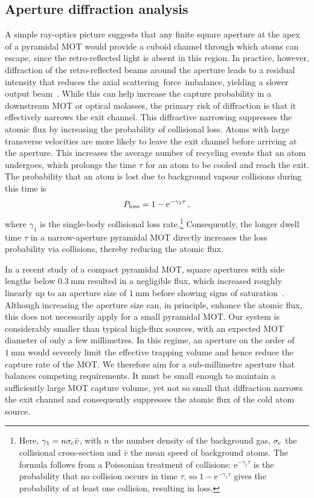 \documentclass[../Thesis-IJspeert.tex]{subfiles}
\begin{document}
\subsection{Aperture diffraction analysis}
\label{pyramidMOTaperture}
A simple ray-optics picture suggests that any finite square aperture at the apex of a pyramidal MOT would provide a cuboid channel through which atoms can escape, since the retro-reflected light is absent in this region. In practice, however, diffraction of the retro-reflected beams around the aperture leads to a residual intensity that reduces the axial scattering force imbalance, yielding a slower output beam~\cite{ravenhall2018a}. While this can help increase the capture probability in a downstream MOT or optical molasses, the primary risk of diffraction is that it effectively narrows the exit channel. This diffractive narrowing suppresses the atomic flux by increasing the probability of collisional loss. Atoms with large transverse velocities are more likely to leave the exit channel before arriving at the aperture. This increases the average number of recycling events that an atom undergoes, which prolongs the time $\tau$ for an atom to be cooled and reach the exit. The probability that an atom is lost due to background vapour collisions during this time is
\begin{equation}
P_{\rm loss} = 1 - \mathrm{e}^{-\gamma_1 \tau}\,,
\end{equation}
where $\gamma_1$ is the single-body collisional loss rate.\footnote{Here, $\gamma_1 = n \sigma_{\rm c} \bar{v}$, with $n$ the number density of the background gas, $\sigma_{\rm c}$ the collisional cross-section and $\bar{v}$ the mean speed of background atoms. The formula follows from a Poissonian treatment of collisions: $\mathrm{e}^{-\gamma_1 \tau}$ is the probability that no collision occurs in time $\tau$, so $1 - \mathrm{e}^{-\gamma_1 \tau}$ gives the probability of at least one collision, resulting in loss.} Consequently, the longer dwell time $\tau$ in a narrow-aperture pyramidal MOT directly increases the loss probability via collisions, thereby reducing the atomic flux.

In a recent study of a compact pyramidal MOT, square apertures with side lengths below $\SI{0.3}{\milli\meter}$ resulted in a negligible flux, which increased roughly linearly up to an aperture size of $\SI{1}{\milli\meter}$ before showing signs of saturation~\cite{Ravenhall2021}. Although increasing the aperture size can, in principle, enhance the atomic flux, this does not necessarily apply for a small pyramidal MOT. Our system is considerably smaller than typical high-flux sources, with an expected MOT diameter of only a few millimetres. In this regime, an aperture on the order of $\SI{1}{\milli\meter}$ would severely limit the effective trapping volume and hence reduce the capture rate of the MOT. We therefore aim for a sub-millimetre aperture that balances competing requirements. It must be small enough to maintain a sufficiently large MOT capture volume, yet not so small that diffraction narrows the exit channel and consequently suppresses the atomic flux of the cold atom source.
\end{document}
